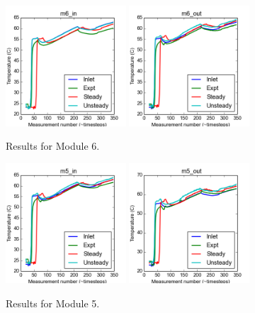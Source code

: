 \documentclass{article}
\begin{document}
\begin{figure}[!ht]
\centering
\includegraphics[width=0.4\textwidth]{../../data/ICSolar/images/Feb6_m6_in_compare.png}\hspace{0.05\textwidth}
\includegraphics[width=0.4\textwidth]{../../data/ICSolar/images/Feb6_m6_out_compare.png}\hspace{0.05\textwidth}\\
\caption{Results for Module 6.}\end{figure}
\begin{figure}[!ht]
\centering
\includegraphics[width=0.4\textwidth]{../../data/ICSolar/images/Feb6_m5_in_compare.png}\hspace{0.05\textwidth}
\includegraphics[width=0.4\textwidth]{../../data/ICSolar/images/Feb6_m5_out_compare.png}\hspace{0.05\textwidth}\\
\caption{Results for Module 5.}\end{figure}
\end{document}
